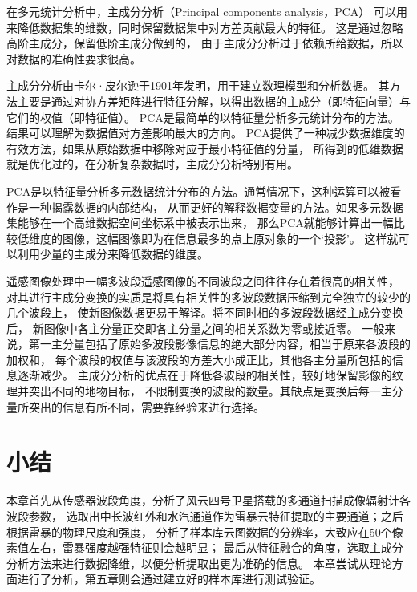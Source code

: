 在多元统计分析中，主成分分析（Principal components analysis，PCA）
可以用来降低数据集的维数，同时保留数据集中对方差贡献最大的特征。
这是通过忽略高阶主成分，保留低阶主成分做到的，
由于主成分分析过于依赖所给数据，所以对数据的准确性要求很高。

主成分分析由卡尔·皮尔逊于1901年发明，用于建立数理模型和分析数据。
其方法主要是通过对协方差矩阵进行特征分解，以得出数据的主成分（即特征向量）与它们的权值（即特征值）。
PCA是最简单的以特征量分析多元统计分布的方法。 结果可以理解为数据值对方差影响最大的方向。
PCA提供了一种减少数据维度的有效方法，如果从原始数据中移除对应于最小特征值的分量，
所得到的低维数据就是优化过的，在分析复杂数据时，主成分分析特别有用。

PCA是以特征量分析多元数据统计分布的方法。通常情况下，这种运算可以被看作是一种揭露数据的内部结构，
从而更好的解释数据变量的方法。如果多元数据集能够在一个高维数据空间坐标系中被表示出来，
那么PCA就能够计算出一幅比较低维度的图像，这幅图像即为在信息最多的点上原对象的一个‘投影’。
这样就可以利用少量的主成分来降低数据的维度。

遥感图像处理中一幅多波段遥感图像的不同波段之间往往存在着很高的相关性，
对其进行主成分变换的实质是将具有相关性的多波段数据压缩到完全独立的较少的几个波段上，
使新图像数据更易于解译。将不同时相的多波段数据经主成分变换后，
新图像中各主分量正交即各主分量之间的相关系数为零或接近零。
一般来说，第一主分量包括了原始多波段影像信息的绝大部分内容，相当于原来各波段的加权和，
每个波段的权值与该波段的方差大小成正比，其他各主分量所包括的信息逐渐减少。
主成分分析的优点在于降低各波段的相关性，较好地保留影像的纹理并突出不同的地物目标，
不限制变换的波段的数量。其缺点是变换后每一主分量所突出的信息有所不同，需要靠经验来进行选择\cite{zhuchengfen}。

\section{小结}
本章首先从传感器波段角度，分析了风云四号卫星搭载的多通道扫描成像辐射计各波段参数，
选取出中长波红外和水汽通道作为雷暴云特征提取的主要通道；之后根据雷暴的物理尺度和强度，
分析了样本库云图数据的分辨率，大致应在50个像素值左右，雷暴强度越强特征则会越明显；
最后从特征融合的角度，选取主成分分析方法来进行数据降维，以便分析提取出更为准确的信息。
本章尝试从理论方面进行了分析，第五章则会通过建立好的样本库进行测试验证。
